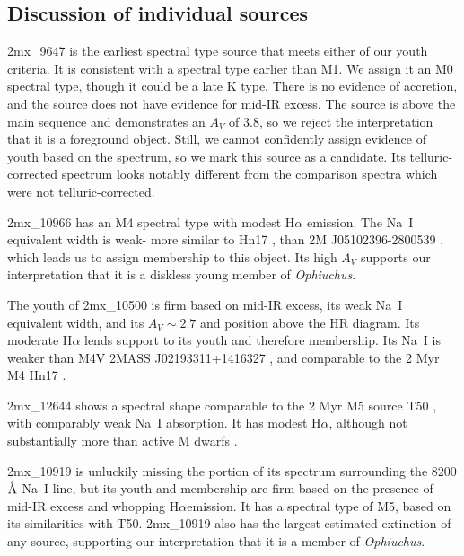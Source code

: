 \documentclass[12pt,preprint]{aastex}
\newcommand{\angstrom}{\mbox{\normalfont\AA}}
\begin{document}
\begin{landscape}
	
\end{landscape}

\subsection{Discussion of individual sources}
\label{sec_individual_sources}
2mx\_9647 is the earliest spectral type source that meets either of our youth criteria.  It is consistent with a spectral type earlier than M1.  We assign it an M0 spectral type, though it could be a late K type.  There is no evidence of accretion, and the source does not have evidence for mid-IR excess.  The source is above the main sequence and demonstrates an $A_V$ of 3.8, so we reject the interpretation that it is a foreground object.  Still, we cannot confidently assign evidence of youth based on the spectrum, so we mark this source as a candidate.  Its telluric-corrected spectrum looks notably different from the comparison spectra which were not telluric-corrected.  

2mx\_10966 has an M4 spectral type with modest H$\alpha$ emission.  The Na~I equivalent width is weak- more similar to Hn17 \citep{2004ApJ...602..816L}, than 2M J05102396-2800539 \citep{2007AJ....133..439C}, which leads us to assign membership to this object.  Its high $A_V$ supports our interpretation that it is a diskless young member of \emph{Ophiuchus}.

The youth of 2mx\_10500 is firm based on mid-IR excess, its weak Na~I equivalent width, and its $A_V\sim2.7$ and position above the HR diagram.  Its moderate H$\alpha$ lends support to its youth and therefore membership.  Its Na~I is weaker than M4V 2MASS J02193311+1416327 \citep{2003AJ....126.2421C}, and comparable to the 2 Myr M4 Hn17 \citep{2004ApJ...602..816L}.

2mx\_12644 shows a spectral shape comparable to the 2 Myr M5 source T50 \citep{2004ApJ...602..816L}, with comparably weak Na~I absorption.  It has modest H$\alpha$, although not substantially more than active M dwarfs \citep{2011AJ....141...97W}.  

2mx\_10919 is unluckily missing the portion of its spectrum surrounding the 8200 $\angstrom$ Na~I line, but its youth and membership are firm based on the presence of mid-IR excess and whopping H$\alpha$emission.  It has a spectral type of M5, based on its similarities with T50.  2mx\_10919 also has the largest estimated extinction of any source, supporting our interpretation that it is a member of \emph{Ophiuchus}.
\end{document}
